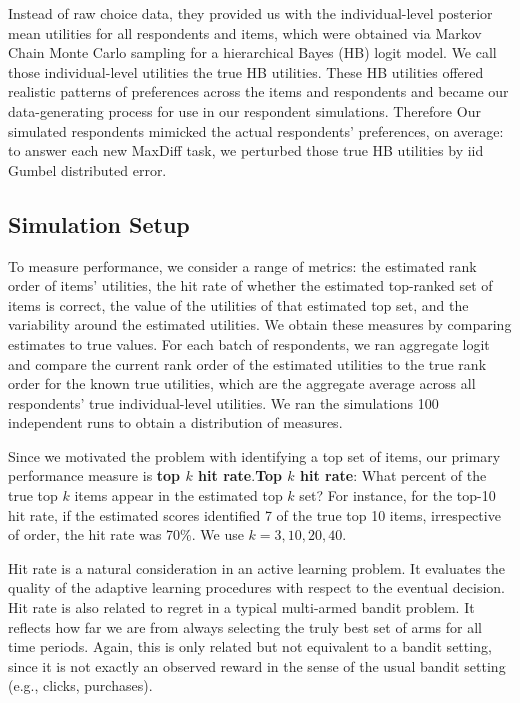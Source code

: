 \documentclass[nonblindrev]{informs3}
\begin{document}
Instead of raw choice data, they provided us with the individual-level posterior mean utilities for all respondents and items, which were obtained via Markov Chain Monte Carlo sampling for a hierarchical Bayes (HB) logit model. We call those individual-level utilities the true HB utilities.  These HB utilities offered realistic patterns of preferences across the items and respondents and became our data-generating process for use in our respondent simulations.  Therefore Our simulated respondents mimicked the actual respondents' preferences, on average: to answer each new MaxDiff task, we perturbed those true HB utilities by iid Gumbel distributed error.  

\subsection{Simulation Setup}
To measure performance, we consider a range of metrics: the estimated rank order of items' utilities, the hit rate of whether the estimated top-ranked set of items is correct, the value of the utilities of that estimated top set, and the variability around the estimated utilities. We obtain these measures by comparing estimates to true values. For each batch of respondents, we ran aggregate logit and compare the current rank order of the estimated utilities to the true rank order for the known true utilities, which are the aggregate average across all respondents' true individual-level utilities. We ran the simulations 100 independent runs to obtain a distribution of measures. 

Since we motivated the problem with identifying a top set of items, our primary performance measure is \textbf{top $k$ hit rate}.\textbf{Top $k$ hit rate}: What percent of the true top $k$ items appear in the estimated top $k$ set? For instance, for the top-10 hit rate, if the estimated scores identified 7 of the true top 10 items, irrespective of order, the hit rate was 70\%. We use $k=3,10,20,40$. 

Hit rate is a natural consideration in an active learning problem. It evaluates the quality of the adaptive learning procedures with respect to the eventual decision. Hit rate is also related to regret in a typical multi-armed bandit problem. It reflects how far we are from always selecting the truly best set of arms for all time periods. Again, this is only related but not equivalent to a bandit setting, since it is not exactly an observed reward in the sense of the usual bandit setting (e.g., clicks, purchases). 
\end{document}
